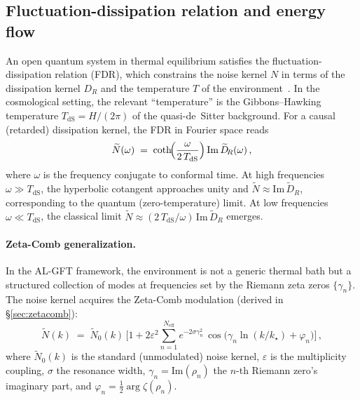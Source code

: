 \documentclass[12pt,a4paper]{article}
\begin{document}
\subsection{Fluctuation-dissipation relation and energy flow}
\label{subsec:FDR}

An open quantum system in thermal equilibrium satisfies the
fluctuation-dissipation relation (FDR), which constrains the noise
kernel $N$ in terms of the dissipation kernel $D_R$ and the
temperature $T$ of the environment~\cite{CalzettaHu2008,HuVerdaguer2004}.
In the cosmological setting, the relevant ``temperature'' is the
Gibbons--Hawking temperature $T_{\mathrm{dS}} = H/(2\pi)$ of the
quasi-de~Sitter background.  For a causal (retarded) dissipation kernel,
the FDR in Fourier space reads
%
\begin{equation}
  \widetilde{N}(\omega)
  \;=\;
  \coth\!\Bigl(\frac{\omega}{2\,T_{\mathrm{dS}}}\Bigr)\,
  \mathrm{Im}\,\widetilde{D}_{\!R}(\omega)\,,
  \label{eq:FDRbasic}
\end{equation}
%
where $\omega$ is the frequency conjugate to conformal time.
At high frequencies $\omega \gg T_{\mathrm{dS}}$, the hyperbolic
cotangent approaches unity and $\widetilde{N} \approx
\mathrm{Im}\,\widetilde{D}_{\!R}$, corresponding to the quantum
(zero-temperature) limit.  At low frequencies
$\omega \ll T_{\mathrm{dS}}$, the classical limit
$\widetilde{N} \approx (2\,T_{\mathrm{dS}}/\omega)\,
\mathrm{Im}\,\widetilde{D}_{\!R}$ emerges.

\paragraph{Zeta-Comb generalization.}
In the AL-GFT framework, the environment is not a generic thermal bath
but a structured collection of modes at frequencies set by the Riemann
zeta zeros $\{\gamma_n\}$.  The noise kernel acquires the Zeta-Comb
modulation (derived in \S\ref{sec:zetacomb}):
%
\begin{equation}
  \widetilde{N}(k)
  \;=\;
  \widetilde{N}_0(k)\,
  \biggl[
    1 + 2\varepsilon^2
    \sum_{n=1}^{N_{\mathrm{eff}}}
    e^{-2\sigma\gamma_n^2}\,
    \cos\!\bigl(\gamma_n \ln(k/k_\star) + \varphi_n\bigr)
  \biggr]\,,
  \label{eq:NZetaComb}
\end{equation}
%
where $\widetilde{N}_0(k)$ is the standard (unmodulated) noise kernel,
$\varepsilon$ is the multiplicity coupling, $\sigma$ the resonance width,
$\gamma_n = \mathrm{Im}(\rho_n)$ the $n$-th Riemann zero's imaginary part,
and $\varphi_n = \tfrac{1}{2}\arg\zeta(\rho_n)$.
\end{document}
